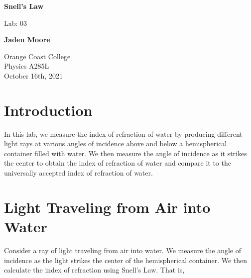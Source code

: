 \documentclass[12pt]{article}
\begin{document}

\begin{filecontents}{data1.csv}
    X	             Y
    0           0
    0.173648178	0.241921896
    0.342020143	0.469471563
    0.406736643	0.559192903
    0.656059029	0.866025404
    0.64278761	0.933580426
    };
\end{filecontents}

\begin{filecontents}{data2.csv}
    X	      Y
    0.000	0.000
    0.225	0.292
    0.276	0.375
    0.375	0.530
    0.515	0.682
    0.755	1.000
    };
\end{filecontents}

\begin{titlepage}
    \begin{center}
        \vspace*{1cm}
        \textbf{Snell's Law}

        \vspace{0.5cm}
        Lab: 03

        \vspace{1cm}

        \textbf{Jaden Moore}

        \vfill

        Orange Coast College\\
        Physics A285L\\
        October 16th, 2021

    \end{center}
\end{titlepage}

\pagestyle{fancy}
\fancyhf{}
\setlength{\headheight}{15pt}
\cfoot{\thepage}

\section{Introduction}
In this lab, we measure the index of refraction of water by producing different light rays at various angles of incidence above and below a hemispherical container filled with water. We then measure the angle of incidence as it strikes the center to obtain the index of refraction of water and compare it to the universally accepted index of refraction of water.

\section{Light Traveling from Air into Water}
Consider a ray of light traveling from air into water. We measure the angle of incidence as the light strikes the center of the hemispherical container. We then calculate the index of refraction using Snell's Law. That is,
\end{document}
